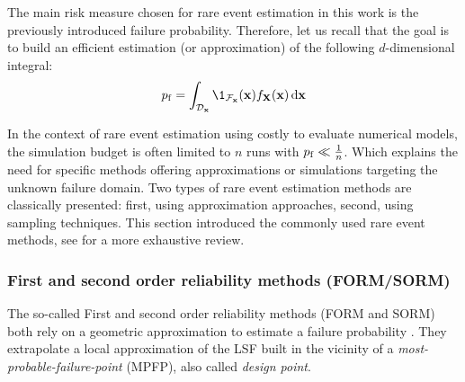 The main risk measure chosen for rare event estimation in this work is the previously introduced failure probability.
Therefore, let us recall that the goal is to build an efficient estimation (or approximation) of the following $d$-dimensional integral: 
\begin{equation}
    \pf = \int_{\iD_\bx} \1_{\iF_\bx}(\bx) f_\bX(\bx) \, \dd\bx
\end{equation}

In the context of rare event estimation using costly to evaluate numerical models, the simulation budget is often limited to $n$ runs with $p_\mathrm{f} \ll \frac1n$. 
Which explains the need for specific methods offering approximations or simulations targeting the unknown failure domain. 
Two types of rare event estimation methods are classically presented: first, using approximation approaches, second, using sampling techniques. 
This section introduced the commonly used rare event methods, see \cite{MorioBalesdent2015} for a more exhaustive review.


\subsubsection{First and second order reliability methods (FORM/SORM)}

The so-called First and second order reliability methods (FORM and SORM) both rely on a geometric approximation to estimate a failure probability \citep{lemaire_2013}.
They extrapolate a local approximation of the LSF built in the vicinity of a \textit{most-probable-failure-point} (MPFP), also called \textit{design point}.

